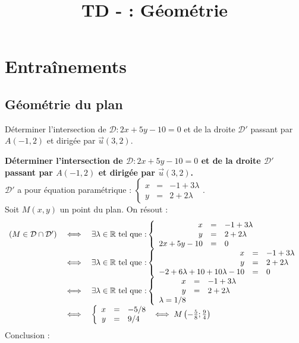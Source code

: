 \documentclass[a4paper, 11pt]{article}
\newcommand{\type}{TD }
\begin{document}
\title{\type -  :  Géométrie}
\section*{Entraînements}
\subsection*{G\'eom\'etrie du plan}


\begin{exercice}  \;
	D\'eterminer l'intersection de $\mathcal{D} : 2x+5y-10=0$ et de la droite $\mathcal{D}'$ passant par $A(-1,2)$ et dirig\'ee par $\vec{u}(3,2)$.
\end{exercice}
\begin{correction}  \;
	\textbf{D\'eterminer l'intersection de $\mathcal{D} : 2x+5y-10=0$ et de la droite $\mathcal{D}'$ passant par $A(-1,2)$ et dirig\'ee par $\vec{u}(3,2)$.}\\
	$\mathcal{D}'$ a pour \'equation param\'etrique : $\left\{\begin{array}{rcl} x&=&-1+3\lambda \\ y&=&2+2\lambda\end{array}\right.$.\\
	Soit $M(x,y)$ un point du plan. On r\'esout :
	$$\begin{array}{rcl}
			\left(M \in {\cal D}\cap {\cal D}' \right) & \iff & \exists \lambda \in \mathbb{R} \textmd{ tel que :} \left\{\begin{array}{rcl} x&=&-1+3\lambda \\ y&=&2+2\lambda \\ 2x+5y-10&=&0 \end{array}\right.                    \\
			                                           & \iff & \exists \lambda \in \mathbb{R} \textmd{ tel que :} \left\{\begin{array}{rcl} x&=&-1+3\lambda \\ y&=&2+2\lambda \\ -2+6\lambda+10+10\lambda-10&=&0 \end{array}\right. \\
			                                           & \iff & \exists \lambda \in \mathbb{R} \textmd{ tel que :} \left\{\begin{array}{rcl} x&=&-1+3\lambda \\ y&=&2+2\lambda \\ \lambda=1/8 \end{array}\right.                     \\
			                                           & \iff & \left\{\begin{array}{rcl} x&=&-5/8 \\ y&=&9/4 \end{array}\right. \iff M\left(-\frac{5}{8};\frac{9}{4}\right)
		\end{array}$$
	Conclusion :  %
\end{correction}
\end{document}
